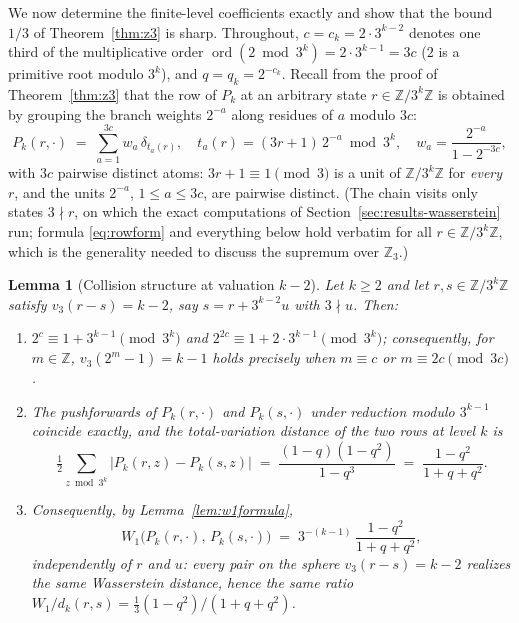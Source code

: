 \documentclass[11pt]{amsart}
\newtheorem{lemma}[theorem]{Lemma}
\theoremstyle{definition}
\theoremstyle{remark}
\newcommand{\Z}{\mathbb{Z}}
\newcommand{\Zthree}{\Z_3}
\newcommand{\dW}{W_1}
\begin{document}
We now determine the finite-level coefficients exactly and show that the bound $1/3$ of Theorem~\ref{thm:z3} is sharp. Throughout, $c = c_k = 2\cdot 3^{k-2}$ denotes one third of the multiplicative order $\operatorname{ord}(2 \bmod 3^k) = 2 \cdot 3^{k-1} = 3c$ ($2$ is a primitive root modulo $3^k$), and $q = q_k = 2^{-c_k}$. Recall from the proof of Theorem~\ref{thm:z3} that the row of $P_k$ at an arbitrary state $r \in \Z/3^k\Z$ is obtained by grouping the branch weights $2^{-a}$ along residues of $a$ modulo $3c$:
\begin{equation}\label{eq:rowform}
P_k(r,\cdot) \;=\; \sum_{a=1}^{3c} w_a\, \delta_{t_a(r)}, \quad t_a(r) = (3r+1)\,2^{-a} \bmod 3^k, \quad w_a = \frac{2^{-a}}{1 - 2^{-3c}} ,
\end{equation}
with $3c$ pairwise distinct atoms: $3r+1 \equiv 1 \pmod 3$ is a unit of $\Z/3^k\Z$ for \emph{every} $r$, and the units $2^{-a}$, $1 \le a \le 3c$, are pairwise distinct. (The chain visits only states $3 \nmid r$, on which the exact computations of Section~\ref{sec:results-wasserstein} run; formula \eqref{eq:rowform} and everything below hold verbatim for all $r \in \Z/3^k\Z$, which is the generality needed to discuss the supremum over $\Zthree$.)

\begin{lemma}[Collision structure at valuation $k-2$]\label{lem:collision}
Let $k \ge 2$ and let $r, s \in \Z/3^k\Z$ satisfy $v_3(r-s) = k-2$, say $s = r + 3^{k-2}u$ with $3 \nmid u$. Then:
\begin{enumerate}
\item $2^{c} \equiv 1 + 3^{k-1} \pmod{3^k}$ and $2^{2c} \equiv 1 + 2\cdot 3^{k-1} \pmod{3^k}$; consequently, for $m \in \Z$, $v_3(2^m - 1) = k - 1$ holds precisely when $m \equiv c$ or $m \equiv 2c \pmod{3c}$.
\item The pushforwards of $P_k(r,\cdot)$ and $P_k(s,\cdot)$ under reduction modulo $3^{k-1}$ coincide exactly, and the total-variation distance of the two rows at level $k$ is
\[
\tfrac12 \sum_{z \bmod 3^k} \bigl| P_k(r,z) - P_k(s,z) \bigr| \;=\; \frac{(1-q)(1-q^2)}{1-q^3} \;=\; \frac{1-q^2}{1+q+q^2} .
\]
\item Consequently, by Lemma~\ref{lem:w1formula},
\[
\dW\bigl(P_k(r,\cdot),\, P_k(s,\cdot)\bigr) \;=\; 3^{-(k-1)}\, \frac{1-q^2}{1+q+q^2},
\]
independently of $r$ and $u$: every pair on the sphere $v_3(r-s) = k-2$ realizes the same Wasserstein distance, hence the same ratio $\dW/d_k(r,s) = \tfrac13 (1-q^2)/(1+q+q^2)$.
\end{enumerate}
\end{lemma}
\end{document}

